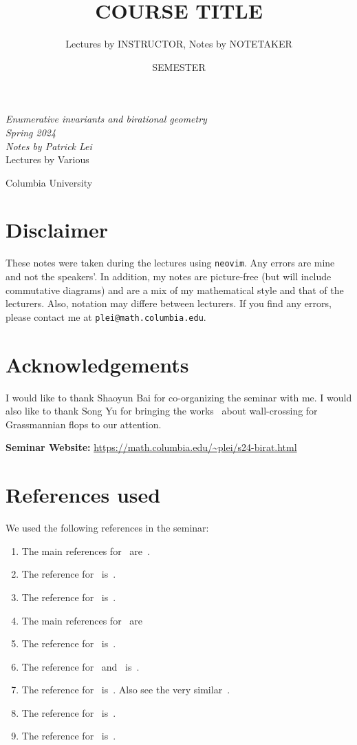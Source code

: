 \documentclass[leqno, openany]{memoir}
\title{COURSE TITLE}
\author{Lectures by INSTRUCTOR, Notes by NOTETAKER}
\date{SEMESTER}
\theoremstyle{definition}
\theoremstyle{remark}
\theoremstyle{plain}
\theoremstyle{definition}
\theoremstyle{remark}
\newcommand*{\titleSW}
    {\begingroup%
    \raggedleft
    \vspace*{\baselineskip}
    {\Huge\itshape Enumerative invariants and birational geometry\\ Spring 2024}\\[\baselineskip]
    {\large\itshape Notes by Patrick Lei}\\[0.2\textheight]
    {\Large Lectures by Various}\par
    \vfill
    {\Large \sffamily Columbia University}
    \vspace*{\baselineskip}
\endgroup}
\begin{document}
    
\begin{titlingpage}
\titleSW
\end{titlingpage}

\thispagestyle{empty}
\section*{Disclaimer}%
\label{sec:disclaimer}

These notes were taken during the lectures using \texttt{neovim}. 
Any errors are mine and not the speakers'. 
In addition, my notes are picture-free (but will include commutative diagrams) and are a mix of my mathematical style and that of the lecturers. Also, notation may differe between lecturers.
If you find any errors, please contact me at \texttt{plei@math.columbia.edu}.

\section*{Acknowledgements}
I would like to thank Shaoyun Bai for co-organizing the seminar with me. I would also like to thank Song Yu for bringing the works~\cite{wcfmgrassmannflop,ctcgrassmannianflop} about wall-crossing for Grassmannian flops to our attention.

\vspace*{1cm}

\noindent\textbf{Seminar Website:}  \url{https://math.columbia.edu/~plei/s24-birat.html}
\newpage
\section*{References used}%
\label{sec:References used}

We used the following references in the seminar:
\begin{enumerate}
    \item The main references for~ are~\cite{symplfrob,geom2dtft,coatesthesis}.
    \item The reference for~ is~\cite{qrr}.
    \item The reference for~ is~\cite{shifttoricmirror}.
    \item The main references for~ are~\cite{ctctoricci,gwdmstack,orbqrr}
    \item The reference for~ is~\cite[Section 3]{ctctoricci}.
    \item The reference for~ and~ is~\cite{ctctoricci}.
    \item The reference for~ is~\cite{wcfmgrassmannflop}. Also see the very similar~\cite{ctcgrassmannianflop}.
    \item The reference for~ is~\cite{qcohprojbundle}.
    \item The reference for~ is~\cite{qcohblowup}.
\end{enumerate}
\end{document}

